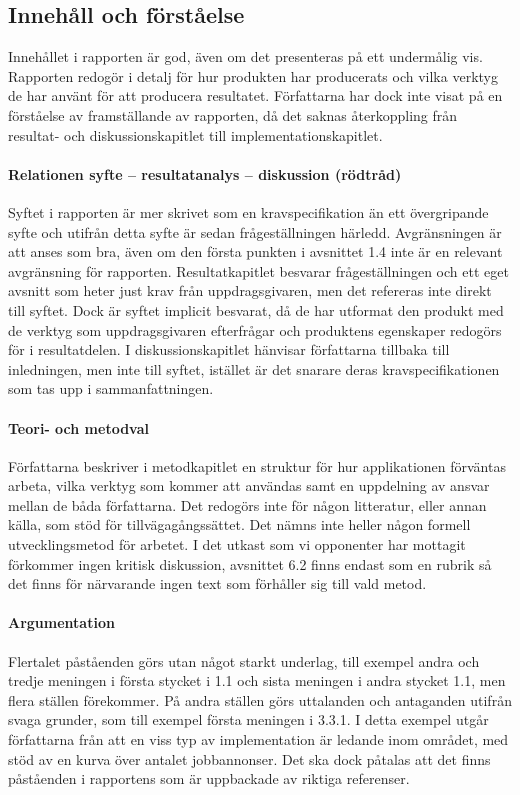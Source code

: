     \subsection{Innehåll och förståelse} %
    \label{sub:innehall}
    Innehållet i rapporten är god, även om det presenteras på ett undermålig vis. Rapporten redogör i detalj för hur produkten har producerats och vilka verktyg de har använt för att producera resultatet. Författarna har dock inte visat på en förståelse av framställande av rapporten, då det saknas återkoppling från resultat- och diskussionskapitlet till implementationskapitlet.

    \paragraph{Relationen syfte – resultatanalys – diskussion (rödtråd)}
        Syftet i rapporten är mer skrivet som en kravspecifikation än ett övergripande syfte och utifrån detta syfte är sedan frågeställningen härledd. Avgränsningen är att anses som bra, även om den första punkten i avsnittet 1.4 inte är en relevant avgränsning för rapporten. Resultatkapitlet besvarar frågeställningen och ett eget avsnitt som heter just krav från uppdragsgivaren, men det refereras inte direkt till syftet. Dock är syftet implicit besvarat, då de har utformat den produkt med de verktyg som uppdragsgivaren efterfrågar och produktens egenskaper redogörs för i resultatdelen. I diskussionskapitlet hänvisar författarna tillbaka till inledningen, men inte till syftet, istället är det snarare deras kravspecifikationen som tas upp i sammanfattningen.

    \paragraph{Teori- och metodval}
        Författarna beskriver i metodkapitlet en struktur för hur applikationen förväntas arbeta, vilka verktyg som kommer att användas samt en uppdelning av ansvar mellan de båda författarna. Det redogörs inte för någon litteratur, eller annan källa, som stöd för tillvägagångssättet. Det nämns inte heller någon formell utvecklingsmetod för arbetet. I det utkast som vi opponenter har mottagit förkommer ingen kritisk diskussion, avsnittet 6.2 finns endast som en rubrik så det finns för närvarande ingen text som förhåller sig till vald metod.

    \paragraph{Argumentation}
        Flertalet påståenden görs utan något starkt underlag, till exempel andra och tredje meningen i första stycket i 1.1 och sista meningen i andra stycket 1.1, men flera ställen förekommer. På andra ställen görs uttalanden och antaganden utifrån svaga grunder, som till exempel första meningen i 3.3.1. I detta exempel utgår författarna från att en viss typ av implementation är ledande inom området, med stöd av en kurva över antalet jobbannonser. Det ska dock påtalas att det finns påståenden i rapportens som är uppbackade av riktiga referenser.

